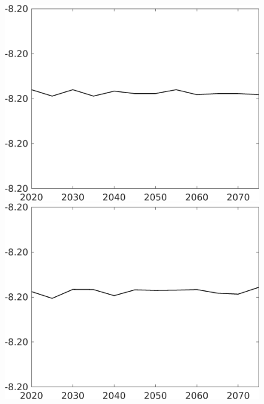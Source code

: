 \documentclass[12pt]{article}
\begin{document}
\begin{figure}[h!!]
\begin{minipage}[]{0.32\textwidth}
		\includegraphics[width=1\textwidth]{../../codding_model/own_basedOnFried/optimalPol_010922_revision/figures/all_13Sept22/CompTaul_Equlab_LFBAUPer_Reg0_hh_spillover0_nsk1_xgr1_knspil0_sep1_countec0_GovRev0_etaa0.79.png}
	\end{minipage}	
	\begin{minipage}[]{0.32\textwidth}
		\includegraphics[width=1\textwidth]{../../codding_model/own_basedOnFried/optimalPol_010922_revision/figures/all_13Sept22/CompTaul_Equlab_LFBAUPer_Reg0_C_spillover0_nsk1_xgr1_knspil0_sep1_countec0_GovRev0_etaa0.79.png}
	\end{minipage}	

\end{figure}
\end{document}
